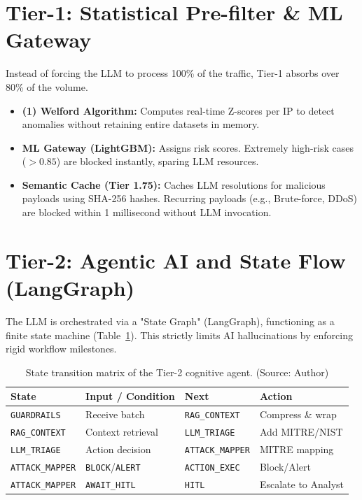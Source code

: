 \section{Tier-1: Statistical Pre-filter \& ML Gateway}
Instead of forcing the LLM to process 100\% of the traffic, Tier-1 absorbs over 80\% of the volume.
\begin{itemize}
    \item \textbf{(1) Welford Algorithm:} Computes real-time Z-scores per IP to detect anomalies without retaining entire datasets in memory.
    \item \textbf{ML Gateway (LightGBM):} Assigns risk scores. Extremely high-risk cases ($>0.85$) are blocked instantly, sparing LLM resources.
    \item \textbf{Semantic Cache (Tier 1.75):} Caches LLM resolutions for malicious payloads using SHA-256 hashes. Recurring payloads (e.g., Brute-force, DDoS) are blocked within 1 millisecond without LLM invocation.
\end{itemize}

\section{Tier-2: Agentic AI and State Flow (LangGraph)}
The LLM is orchestrated via a "State Graph" (LangGraph), functioning as a finite state machine (Table~\ref{tab:agent_fsm_transitions}). This strictly limits AI hallucinations by enforcing rigid workflow milestones.

\begin{table}[!htbp]
    \centering
    \caption{State transition matrix of the Tier-2 cognitive agent. (Source: Author)}
    \label{tab:agent_fsm_transitions}
    \begin{tabular}{|>{\raggedright\arraybackslash}p{}|>{\raggedright\arraybackslash}p{}|>{\raggedright\arraybackslash}p{}|>{\raggedright\arraybackslash}p{}|}
        \hline
        \textbf{State} & \textbf{Input / Condition} & \textbf{Next} & \textbf{Action} \\
        \hline
        \texttt{GUARDRAILS} & Receive batch & \texttt{RAG\_CONTEXT} & Compress \& wrap \\ \hline
        \texttt{RAG\_CONTEXT} & Context retrieval & \texttt{LLM\_TRIAGE} & Add MITRE/NIST \\ \hline
        \texttt{LLM\_TRIAGE} & Action decision & \texttt{ATTACK\_MAPPER} & MITRE mapping \\ \hline
        \texttt{ATTACK\_MAPPER} & \texttt{BLOCK}/\texttt{ALERT} & \texttt{ACTION\_EXEC} & Block/Alert \\ \hline
        \texttt{ATTACK\_MAPPER} & \texttt{AWAIT\_HITL} & \texttt{HITL} & Escalate to Analyst \\ \hline
    \end{tabular}
\end{table}

